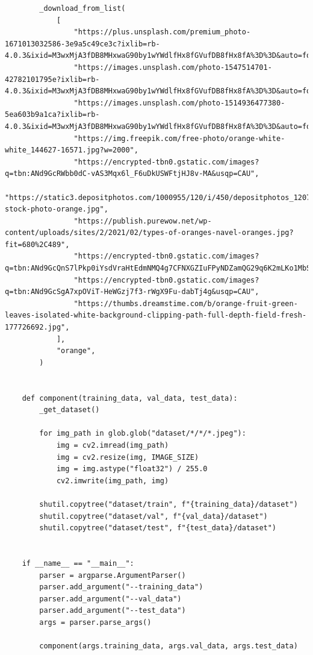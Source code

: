 \begin{verbatim}
        _download_from_list(
            [
                "https://plus.unsplash.com/premium_photo-1671013032586-3e9a5c49ce3c?ixlib=rb-4.0.3&ixid=M3wxMjA3fDB8MHxwaG90by1wYWdlfHx8fGVufDB8fHx8fA%3D%3D&auto=format&fit=crop&w=2787&q=80",
                "https://images.unsplash.com/photo-1547514701-42782101795e?ixlib=rb-4.0.3&ixid=M3wxMjA3fDB8MHxwaG90by1wYWdlfHx8fGVufDB8fHx8fA%3D%3D&auto=format&fit=crop&w=2787&q=80",
                "https://images.unsplash.com/photo-1514936477380-5ea603b9a1ca?ixlib=rb-4.0.3&ixid=M3wxMjA3fDB8MHxwaG90by1wYWdlfHx8fGVufDB8fHx8fA%3D%3D&auto=format&fit=crop&w=2835&q=80",
                "https://img.freepik.com/free-photo/orange-white-white_144627-16571.jpg?w=2000",
                "https://encrypted-tbn0.gstatic.com/images?q=tbn:ANd9GcRWbb0dC-vAS3Mqx6l_F6uDkUSWFtjHJ8v-MA&usqp=CAU",
                "https://static3.depositphotos.com/1000955/120/i/450/depositphotos_1207359-stock-photo-orange.jpg",
                "https://publish.purewow.net/wp-content/uploads/sites/2/2021/02/types-of-oranges-navel-oranges.jpg?fit=680%2C489",
                "https://encrypted-tbn0.gstatic.com/images?q=tbn:ANd9GcQnS7lPkp0iYsdVraHtEdmNMQ4g7CFNXGZIuFPyNDZamQG29q6K2mLKo1MbSeYfn8NdWoM&usqp=CAU",
                "https://encrypted-tbn0.gstatic.com/images?q=tbn:ANd9GcSgA7xpOViT-HeWGzj7f3-rWgX9Fu-dabTj4g&usqp=CAU",
                "https://thumbs.dreamstime.com/b/orange-fruit-green-leaves-isolated-white-background-clipping-path-full-depth-field-fresh-177726692.jpg",
            ],
            "orange",
        )


    def component(training_data, val_data, test_data):
        _get_dataset()

        for img_path in glob.glob("dataset/*/*/*.jpeg"):
            img = cv2.imread(img_path)
            img = cv2.resize(img, IMAGE_SIZE)
            img = img.astype("float32") / 255.0
            cv2.imwrite(img_path, img)

        shutil.copytree("dataset/train", f"{training_data}/dataset")
        shutil.copytree("dataset/val", f"{val_data}/dataset")
        shutil.copytree("dataset/test", f"{test_data}/dataset")


    if __name__ == "__main__":
        parser = argparse.ArgumentParser()
        parser.add_argument("--training_data")
        parser.add_argument("--val_data")
        parser.add_argument("--test_data")
        args = parser.parse_args()

        component(args.training_data, args.val_data, args.test_data)
\end{verbatim}

